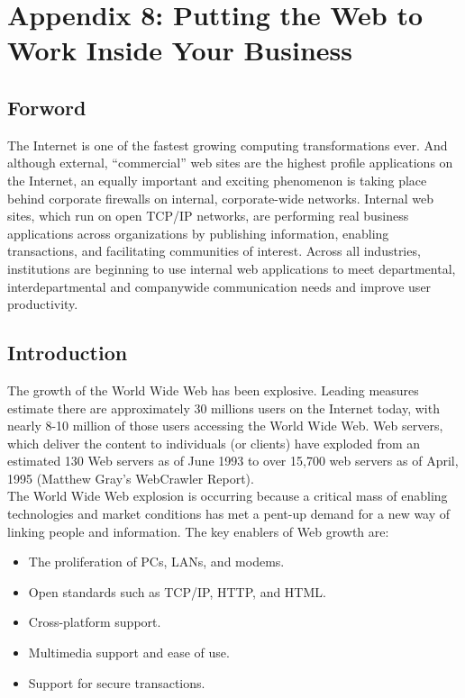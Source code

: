 \chapter{Appendix 8: Putting the Web to Work Inside Your Business}
\label{web_work}

\section{Forword}

The Internet is one of the fastest growing computing transformations
ever. And although external, ``commercial'' web sites are the highest
profile applications on the Internet, an equally important and exciting
phenomenon is taking place behind corporate firewalls on internal,
corporate-wide networks. Internal web sites, which run on open TCP/IP
networks, are performing real business applications across
organizations by publishing information, enabling transactions, and
facilitating communities of interest. Across all industries,
institutions are beginning to use internal web applications to meet
departmental, interdepartmental and companywide communication needs and
improve user productivity.


\section{Introduction}

The growth of the World Wide Web has been explosive. Leading measures
estimate there are approximately 30 millions users on the Internet
today, with nearly 8-10 million of those users accessing the World Wide
Web. Web servers, which deliver the content to individuals (or clients)
have exploded from an estimated 130 Web servers as of June 1993 to over
15,700 web servers as of April, 1995 (Matthew Gray's WebCrawler Report).\\

The World Wide Web explosion is occurring because a critical mass of
enabling technologies and market conditions has met a pent-up demand
for a new way of linking people and information. The key enablers of
Web growth are:
\begin{itemize}
  \item The proliferation of PCs, LANs, and modems.
  \item Open standards such as TCP/IP, HTTP, and HTML.
  \item Cross-platform support.
  \item Multimedia support and ease of use.
  \item Support for secure transactions.
\end{itemize}

